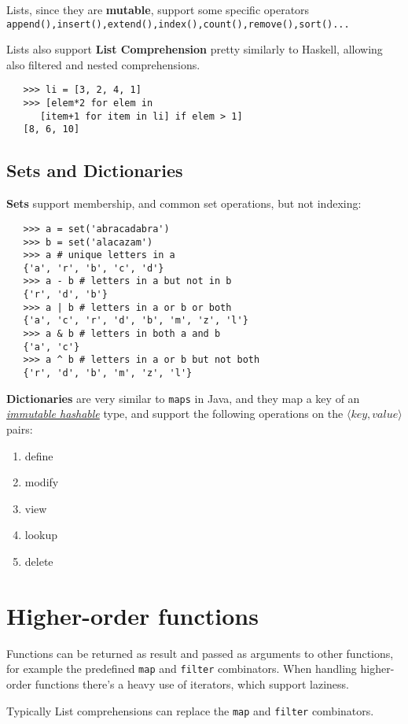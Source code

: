 Lists, since they are \textbf{mutable}, support some specific operators \lstinline|append(),insert(),extend(),index(),count(),remove(),sort()...| 

Lists also support \textbf{List Comprehension} pretty similarly to Haskell, allowing also filtered and nested comprehensions.
\begin{lstlisting}
   >>> li = [3, 2, 4, 1]
   >>> [elem*2 for elem in
      [item+1 for item in li] if elem > 1]
   [8, 6, 10]
\end{lstlisting}

\subsection{Sets and Dictionaries}
\textbf{Sets} support membership, and common set operations, but not indexing:
\begin{lstlisting}
   >>> a = set('abracadabra')
   >>> b = set('alacazam')
   >>> a # unique letters in a
   {'a', 'r', 'b', 'c', 'd'}
   >>> a - b # letters in a but not in b
   {'r', 'd', 'b'}
   >>> a | b # letters in a or b or both
   {'a', 'c', 'r', 'd', 'b', 'm', 'z', 'l'}
   >>> a & b # letters in both a and b
   {'a', 'c'}
   >>> a ^ b # letters in a or b but not both
   {'r', 'd', 'b', 'm', 'z', 'l'}
\end{lstlisting}

\textbf{Dictionaries} are very similar to \lstinline|maps| in Java, and they map a key of an \underline{\textit{immutable hashable}} type,
and support the following operations on the $\langle key,value \rangle$pairs:
\begin{enumerate}
   \item define
   \item modify
   \item view
   \item lookup
   \item delete
\end{enumerate}

\section{Higher-order functions}
Functions can be returned as result and passed as arguments to other functions, for example the predefined \lstinline|map| and \lstinline|filter| combinators.
When handling higher-order functions there's a heavy use of iterators, which support laziness.

Typically List comprehensions can replace the \lstinline|map| and \lstinline|filter| combinators.

